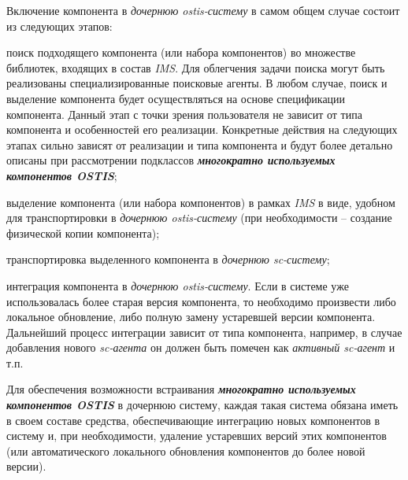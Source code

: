 \begin{SCn}
{Включение компонента в \textit{дочернюю ostis-систему} в самом общем случае состоит из следующих этапов:
\begin{scnitemize}
    \item поиск подходящего компонента (или набора компонентов) во множестве библиотек, входящих в состав \textit{IMS}. Для облегчения задачи поиска могут быть реализованы специализированные поисковые агенты. В любом случае, поиск и выделение компонента будет осуществляться на основе спецификации компонента. Данный этап с точки зрения пользователя не зависит от типа компонента и особенностей его реализации. Конкретные действия на следующих  этапах сильно зависят от реализации и типа компонента и будут более детально описаны при рассмотрении подклассов \textbf{\textit{многократно используемых компонентов OSTIS}};
    \item выделение компонента (или набора компонентов) в рамках \textit{IMS} в виде, удобном для транспортировки в \textit{дочернюю ostis-систему} (при необходимости – создание физической копии компонента);
    \item транспортировка выделенного компонента в \textit{дочернюю sc-систему};
    \item интеграция компонента в \textit{дочернюю ostis-систему}. Если в системе уже использовалась более старая версия компонента, то необходимо произвести либо локальное обновление, либо полную замену устаревшей версии компонента. Дальнейший процесс интеграции зависит от типа компонента, например, в случае добавления нового \textit{sc-агента} он должен быть помечен как \textit{активный sc-агент} и т.п.
\end{scnitemize}

Для обеспечения возможности встраивания \textbf{\textit{многократно используемых компонентов OSTIS}} в дочернюю систему, каждая такая система обязана иметь в своем составе средства, обеспечивающие интеграцию новых компонентов в систему и, при необходимости, удаление устаревших версий этих компонентов (или автоматического локального обновления компонентов до более новой версии).}




\end{SCn}
